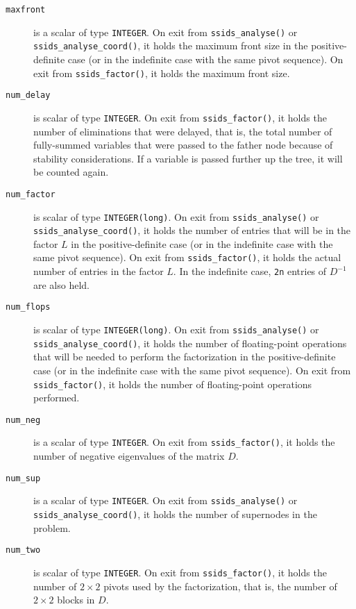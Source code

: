 \begin{description}
\item[\texttt{maxfront}] is a scalar of type  {\tt INTEGER}. On exit from
{\tt ssids\_analyse()} or {\tt ssids\_analyse\_coord()}, it holds the maximum front size
in the positive-definite case (or in the indefinite case with
the same pivot sequence). On exit from
{\tt ssids\_factor()}, it holds the maximum front size.

\item[\texttt{num\_delay}] is scalar of type  {\tt INTEGER}. On exit from
{\tt ssids\_factor()}, it holds the
number of eliminations that were
delayed, that is, the total number of fully-summed
variables that were passed to the father node because
of stability considerations. If a variable is passed
further up the tree, it will be counted again.

\item[\texttt{num\_factor}] is scalar of type {\tt INTEGER(long)}. On exit from
{\tt ssids\_analyse()}  or {\tt ssids\_analyse\_coord()}, it holds the number of entries that will be in the
factor $L$ in the positive-definite case (or in the indefinite case with
the same pivot sequence). On exit from
{\tt ssids\_factor()},
it holds the actual number of entries in the factor
$L$. In the indefinite case, {\tt 2n} entries of ${D}^{-1}$ are
also held.

\item[\texttt{num\_flops}] is scalar of type {\tt INTEGER(long)}. On exit from
{\tt ssids\_analyse()}  or {\tt ssids\_analyse\_coord()}, it holds the number of
floating-point operations that
will be needed to perform the factorization
in the positive-definite case (or in the indefinite case  with
the same pivot sequence).  On exit from {\tt ssids\_factor()}, it holds the
number of floating-point operations performed.

\item[\texttt{num\_neg}] is a scalar  of type  {\tt INTEGER}.
On exit from {\tt ssids\_factor()}, it holds
the number of negative eigenvalues of the matrix $D$.


\item[\texttt{num\_sup}] is a scalar of type  {\tt INTEGER}.
On exit from {\tt ssids\_analyse()}  or {\tt ssids\_analyse\_coord()}, it holds
the number of supernodes in the problem.

\item[\texttt{num\_two}] is scalar of type  {\tt INTEGER}.
On exit from
{\tt ssids\_factor()}, it holds the number
of $2 \times 2$ pivots used by the factorization, that is,
the number of $2 \times 2$ blocks in $D$.


\end{description}
